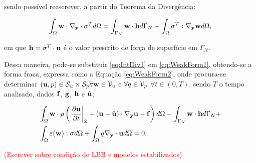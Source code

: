 \documentclass[_ArquivoPrincipal.tex]{subfiles}
\begin{document}
\noindent sendo possível reescrever, a partir do Teorema da Divergência:

\begin{equation}
     \int_\Omega{\mathbf{w}\cdot\mathbf{\nabla_y}\cdot\mathbf{\sigma}^Td\Omega}=
     \int_{\Gamma_N}{\mathbf{w}\cdot\mathbf{h}d\Gamma_N}-\int_\Omega{\mathbf{\sigma}^T:\mathbf{\nabla_y}\mathbf{w}d\Omega}\text{,}
     \label{eq:IntDiv1}
\end{equation}

\noindent em que $\mathbf{h}=\mathbf{\sigma}^T\cdot\mathbf{n}$ é o valor prescrito de força de superfície em $\Gamma_N$.

Dessa maneira, pode-se substituir \ref{eq:IntDiv1} em \ref{eq:WeakForm1}, obtendo-se a forma fraca, expressa como a Equação \ref{eq:WeakForm2}, onde procura-se determinar $(\mathbf{u},p)\in\mathcal{S}_u\times\mathcal{S}_p\forall\mathbf{w}\in\mathcal{V}_u$ e $\forall q\in\mathcal{V}_p$ $\forall t\in(0,T)$, sendo $T$ o tempo analisado, dados $\mathbf{f}$, $\mathbf{g}$, $\mathbf{h}$ e $\hat{\mathbf{u}}$:

\begin{equation}
    \begin{split}
        &\int_\Omega{\mathbf{w}\cdot\rho\left(\left.\frac{\partial{\mathbf{u}}}{\partial{t}}\right|_{\hat{\mathbf{x}}}+(\mathbf{u}-\hat{\mathbf{u}})\cdot\mathbf{\nabla_y}\mathbf{u}-\mathbf{f}\right)d\Omega}-\int_{\Gamma_N}{\mathbf{w}\cdot\mathbf{h}d\Gamma_N}+\\
        &\int_\Omega{\mathbf{\varepsilon(w)}:\mathbf{\sigma}d\Omega}+\int_\Omega{q\mathbf{\nabla_y}\cdot\mathbf{u}d\Omega}=0\text{.}
    \end{split}
    \label{eq:WeakForm2}
\end{equation}

\textcolor{red}{(Escrever sobre condição de LBB e modelos estabilizados)}
\end{document}
